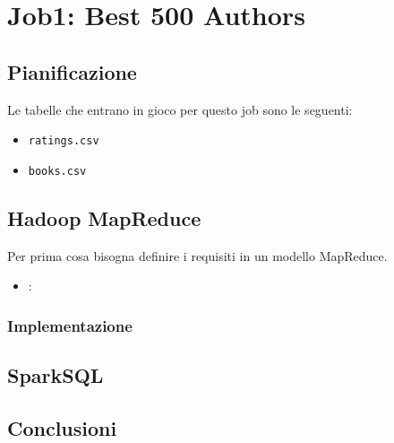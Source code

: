 \section{Job1: Best 500 Authors}


\subsection{Pianificazione}
Le tabelle che entrano in gioco per questo job sono le seguenti:
\begin{itemize}
    \item \texttt{ratings.csv}
    \item \texttt{books.csv}
\end{itemize}



\subsection{Hadoop MapReduce}

Per prima cosa bisogna definire i requisiti in un modello MapReduce.
\begin{itemize}
    \item \textbf{}: %
\end{itemize}

\subsubsection{Implementazione}

\subsection{SparkSQL}

\subsection{Conclusioni}

